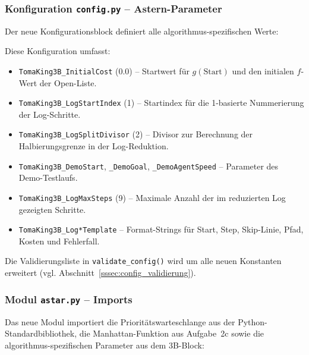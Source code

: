 
\subsubsection{Konfiguration \texttt{config.py} – \acs{Astern}-Parameter}

Der neue Konfigurationsblock definiert alle algorithmus-spezifischen Werte:



Diese Konfiguration umfasst:
\begin{itemize}
    \item \texttt{TomaKing3B\_InitialCost} (0.0) -- Startwert für \(g(\text{Start})\) und den initialen \(f\)-Wert der Open-Liste.
    \item \texttt{TomaKing3B\_LogStartIndex} (1) -- Startindex für die 1-basierte Nummerierung der Log-Schritte.
    \item \texttt{TomaKing3B\_LogSplitDivisor} (2) -- Divisor zur Berechnung der Halbierungsgrenze in der Log-Reduktion.
    \item \texttt{TomaKing3B\_DemoStart}, \texttt{\_DemoGoal}, \texttt{\_DemoAgentSpeed} -- Parameter des Demo-Testlaufs.
    \item \texttt{TomaKing3B\_LogMaxSteps} (9) -- Maximale Anzahl der im reduzierten Log gezeigten Schritte.
    \item \texttt{TomaKing3B\_Log*Template} -- Format-Strings für Start, Step, Skip-Linie, Pfad, Kosten und Fehlerfall.
\end{itemize}

Die Validierungsliste in \texttt{validate\_config()} wird um alle neuen Konstanten erweitert (vgl. Abschnitt~\ref{sssec:config_validierung}).


\subsubsection{Modul \texttt{astar.py} – Imports}

Das neue Modul importiert die Prioritätswarteschlange aus der Python-Standardbibliothek, die Manhattan-Funktion aus Aufgabe~2c sowie die algorithmus-spezifischen Parameter aus dem 3B-Block:

